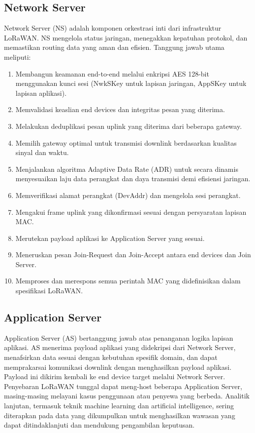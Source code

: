 \subsection{Network Server}
Network Server (NS) adalah komponen orkestrasi inti dari infrastruktur LoRaWAN. NS mengelola status jaringan, menegakkan kepatuhan protokol, dan memastikan routing data yang aman dan efisien. Tanggung jawab utama meliputi:
\begin{enumerate}
    \item Membangun keamanan end-to-end melalui enkripsi AES 128-bit menggunakan kunci sesi (NwkSKey untuk lapisan jaringan, AppSKey untuk lapisan aplikasi).
    \item Memvalidasi keaslian end devices dan integritas pesan yang diterima.
    \item Melakukan deduplikasi pesan uplink yang diterima dari beberapa gateway.
    \item Memilih gateway optimal untuk transmisi downlink berdasarkan kualitas sinyal dan waktu.
    \item Menjalankan algoritma Adaptive Data Rate (ADR) untuk secara dinamis menyesuaikan laju data perangkat dan daya transmisi demi efisiensi jaringan.
    \item Memverifikasi alamat perangkat (DevAddr) dan mengelola sesi perangkat.
    \item Mengakui frame uplink yang dikonfirmasi sesuai dengan persyaratan lapisan MAC.
    \item Merutekan payload aplikasi ke Application Server yang sesuai.
    \item Meneruskan pesan Join-Request dan Join-Accept antara end devices dan Join Server.
    \item Memproses dan merespons semua perintah MAC yang didefinisikan dalam spesifikasi LoRaWAN.
\end{enumerate}
\subsection{Application Server}
Application Server (AS) bertanggung jawab atas penanganan logika lapisan aplikasi. AS menerima payload aplikasi yang didekripsi dari Network Server, menafsirkan data sesuai dengan kebutuhan spesifik domain, dan dapat memprakarsai komunikasi downlink dengan menghasilkan payload aplikasi. Payload ini dikirim kembali ke end device target melalui Network Server. Penyebaran LoRaWAN tunggal dapat meng-host beberapa Application Server, masing-masing melayani kasus penggunaan atau penyewa yang berbeda. Analitik lanjutan, termasuk teknik machine learning dan artificial intelligence, sering diterapkan pada data yang dikumpulkan untuk menghasilkan wawasan yang dapat ditindaklanjuti dan mendukung pengambilan keputusan.
